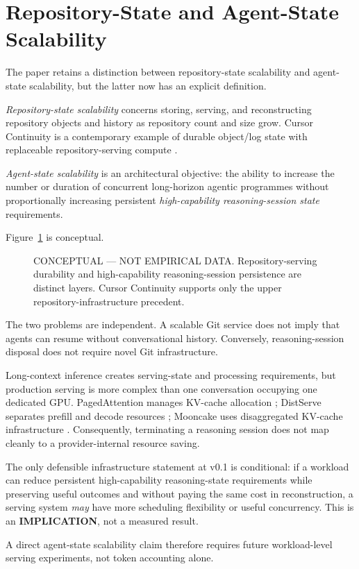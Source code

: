 \section{Repository-State and Agent-State Scalability}
\label{sec:scalability}

The paper retains a distinction between repository-state scalability and agent-state scalability, but the latter now has an explicit definition.

\emph{Repository-state scalability} concerns storing, serving, and reconstructing repository objects and history as repository count and size grow. Cursor Continuity is a contemporary example of durable object/log state with replaceable repository-serving compute \citep{marti2026continuity}.

\emph{Agent-state scalability} is an architectural objective: the ability to increase the number or duration of concurrent long-horizon agentic programmes without proportionally increasing persistent \emph{high-capability reasoning-session state} requirements.

Figure~\ref{fig:scalability-stack} is conceptual.

\begin{figure}[htbp]
\centering

\caption{CONCEPTUAL --- NOT EMPIRICAL DATA. Repository-serving durability and high-capability reasoning-session persistence are distinct layers. Cursor Continuity supports only the upper repository-infrastructure precedent.}
\label{fig:scalability-stack}
\end{figure}

The two problems are independent. A scalable Git service does not imply that agents can resume without conversational history. Conversely, reasoning-session disposal does not require novel Git infrastructure.

Long-context inference creates serving-state and processing requirements, but production serving is more complex than one conversation occupying one dedicated GPU. PagedAttention manages KV-cache allocation \citep{kwon2023vllm}; DistServe separates prefill and decode resources \citep{zhong2024distserve}; Mooncake uses disaggregated KV-cache infrastructure \citep{qin2024mooncake}. Consequently, terminating a reasoning session does not map cleanly to a provider-internal resource saving.

The only defensible infrastructure statement at v0.1 is conditional: if a workload can reduce persistent high-capability reasoning-state requirements while preserving useful outcomes and without paying the same cost in reconstruction, a serving system \emph{may} have more scheduling flexibility or useful concurrency. This is an \textbf{IMPLICATION}, not a measured result.

A direct agent-state scalability claim therefore requires future workload-level serving experiments, not token accounting alone.
